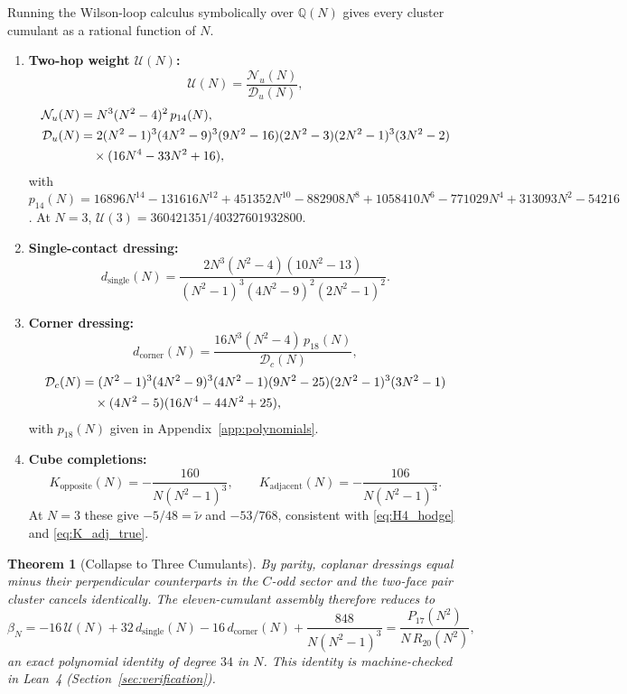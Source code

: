 \documentclass[11pt,a4paper]{article}
\newtheorem{theorem}{Theorem}[section]
\theoremstyle{definition}
\newcommand{\Q}{\mathbb{Q}}
\newcommand{\Utwo}{\mathcal{U}}        %
\begin{document}
Running the Wilson-loop calculus symbolically over $\Q(N)$ gives every cluster cumulant as a rational function of $N$.
\begin{enumerate}
  \item \textbf{Two-hop weight $\Utwo(N)$:}
  \begin{equation}\label{eq:uN_closed}
    \Utwo(N) = \frac{\mathcal{N}_u(N)}{\mathcal{D}_u(N)},
  \end{equation}
  \begin{align}
    \mathcal{N}_u(N) &= N^3(N^2-4)^2\,p_{14}(N), \\
    \mathcal{D}_u(N) &= 2(N^2-1)^3(4N^2-9)^3(9N^2-16)(2N^2-3)(2N^2-1)^3(3N^2-2) \notag \\
      &\quad\times(16N^4-33N^2+16),
  \end{align}
  with $p_{14}(N) = 16896N^{14} - 131616N^{12} + 451352N^{10} - 882908N^8 + 1058410N^6 - 771029N^4 + 313093N^2 - 54216$. At $N=3$, $\Utwo(3) = 360421351/40327601932800$.
  \item \textbf{Single-contact dressing:}
  \begin{equation}\label{eq:dsingle_closed}
    d_{\mathrm{single}}(N) = \frac{2N^3(N^2-4)(10N^2-13)}{(N^2-1)^3(4N^2-9)^2(2N^2-1)^2}.
  \end{equation}
  \item \textbf{Corner dressing:}
  \begin{equation}\label{eq:dcorner_closed}
    d_{\mathrm{corner}}(N) = \frac{16N^3(N^2-4)\,p_{18}(N)}{\mathcal{D}_c(N)},
  \end{equation}
  \begin{align}
    \mathcal{D}_c(N) &= (N^2-1)^3(4N^2-9)^3(4N^2-1)(9N^2-25)(2N^2-1)^3(3N^2-1) \notag \\
      &\quad\times(4N^2-5)(16N^4-44N^2+25),
  \end{align}
  with $p_{18}(N)$ given in Appendix~\ref{app:polynomials}.
  \item \textbf{Cube completions:}
  \begin{equation}\label{eq:K_closed}
    K_{\mathrm{opposite}}(N) = -\frac{160}{N(N^2-1)^3}, \qquad
    K_{\mathrm{adjacent}}(N) = -\frac{106}{N(N^2-1)^3}.
  \end{equation}
  At $N=3$ these give $-5/48 = \tilde\nu$ and $-53/768$, consistent with \eqref{eq:H4_hodge} and \eqref{eq:K_adj_true}.
\end{enumerate}

\begin{theorem}[Collapse to Three Cumulants]\label{thm:three_cumulants}
By parity, coplanar dressings equal minus their perpendicular counterparts in the $C$-odd sector and the two-face pair cluster cancels identically. The eleven-cumulant assembly therefore reduces to
\begin{equation}\label{eq:beta_assembly}
  \beta_N = -16\,\Utwo(N) + 32\,d_{\mathrm{single}}(N) - 16\,d_{\mathrm{corner}}(N) + \frac{848}{N(N^2-1)^3}
  = \frac{P_{17}(N^2)}{N\,R_{20}(N^2)},
\end{equation}
an exact polynomial identity of degree $34$ in $N$. This identity is machine-checked in Lean~4 (Section~\ref{sec:verification}).
\end{theorem}
\end{document}

